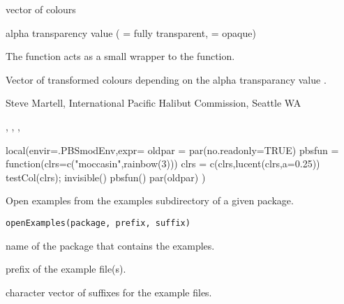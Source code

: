 \documentclass[letterpaper]{book}
\begin{document}
%
\begin{Arguments}
\begin{ldescription}
\item[\code{col.pal}] vector of colours
\item[\code{a}] alpha transparency value ( = fully transparent,  = opaque) 
\end{ldescription}
\end{Arguments}
%
\begin{Details}\relax
The function acts as a small wrapper to the  function.
\end{Details}
%
\begin{Value}
Vector of transformed colours depending on the alpha transparancy value .
\end{Value}
%
\begin{Author}\relax
Steve Martell, International Pacific Halibut Commission, Seattle WA
\end{Author}
%
\begin{SeeAlso}\relax
{}, ,
, 
\end{SeeAlso}
%
\begin{Examples}
\begin{ExampleCode}
local(envir=.PBSmodEnv,expr={
  oldpar = par(no.readonly=TRUE)
  pbsfun = function(clrs=c("moccasin",rainbow(3))){
    clrs = c(clrs,lucent(clrs,a=0.25))
    testCol(clrs); invisible() }
  pbsfun()
  par(oldpar)
})
\end{ExampleCode}
\end{Examples}
%
\begin{Description}\relax
Open examples from the examples subdirectory of a given package.
\end{Description}
%
\begin{Usage}
\begin{verbatim}
openExamples(package, prefix, suffix)
\end{verbatim}
\end{Usage}
%
\begin{Arguments}
\begin{ldescription}
\item[\code{package}] name of the package that contains the examples.
\item[\code{prefix}] prefix of the example file(s).
\item[\code{suffix}] character vector of suffixes for the example files.
\end{ldescription}
\end{Arguments}
\end{document}
